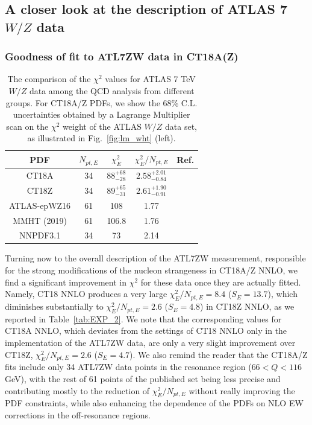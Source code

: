 \subsection{A closer look at the description of ATLAS 7 $W/Z$ data}
\label{sec:CT18Z_qual}


\subsubsection{Goodness of fit to ATL7ZW data in CT18A(Z)}
\label{sec:ATL7ZWchi2}

\begin{table}[tb]
\caption{The comparison of the $\chi^{2}$ values for ATLAS 7 TeV $W/Z$ data among the QCD analysis from different groups. For CT18A/Z PDFs, we show the 68\% C.L. uncertainties obtained by a Lagrange Multiplier scan on the $\chi^2$ weight of the ATLAS $W/Z$ data set, as illustrated in Fig.~\ref{fig:lm_wht} (left).}
\label{tab:CMN}
\begin{tabular}{c|c|c|c|c}
\hline\hline
PDF & $N_{\mathit{pt, E}}$ & $\chi^{2}_E$ & $\chi^{2}_E/N_{\mathit{pt}, E}$ & Ref. \\
\hline
CT18A &  34  & $88^{+68}_{-28}$  & $2.58^{+2.01}_{-0.84}$ & \\
CT18Z & 34 & $89^{+65}_{-31}$ & $2.61^{+1.90}_{-0.91}$  & \\
\hline
ATLAS-epWZ16 &  61 & 108    & 1.77 & \cite{Aaboud:2016btc}\\
MMHT (2019)  &  61 & 106.8  & 1.76 &  \cite{Thorne:2019mpt}\\
NNPDF3.1     &  34 & 73     & 2.14 & \cite{Ball:2017nwa} \\
\hline\hline
\end{tabular}
\end{table}

Turning now to the overall description of the ATL7ZW measurement, responsible for the strong modifications of the nucleon strangeness in CT18A/Z NNLO, we find
a significant improvement in $\chi^2$ for these data once they are actually fitted. Namely, CT18 NNLO produces a very large
$\chi^2_E/N_\mathit{pt,E}\!=\! 8.4$ ($S_E\! =\! 13.7$), which diminishes substantially to
$\chi^2_E/N_\mathit{pt,E}\!=\! 2.6$ ($S_E\! =\! 4.8$) in CT18Z NNLO, as we reported in
Table~\ref{tab:EXP_2}. We note that the corresponding values for CT18A NNLO, which deviates from
the settings of CT18 NNLO only in the implementation of the ATL7ZW data, are only a very
slight improvement over CT18Z, $\chi^2_E/N_\mathit{pt,E}\!=\! 2.6$ ($S_E\! =\! 4.7$). 
We also remind the reader that the CT18A/Z fits include only 34 ATL7ZW data points in the resonance region ($66 < Q < 116$ GeV), with the rest of 61 points of the published set being less precise and contributing mostly to the reduction of $\chi^2_E/N_{pt,E}$ without really improving the PDF constraints, while also enhancing the dependence of the PDFs on NLO EW corrections in the off-resonance regions. 

